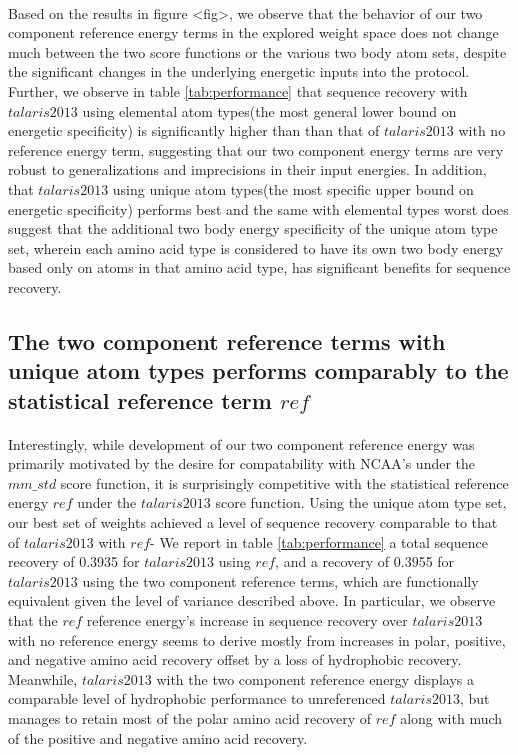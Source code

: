 \paragraph{}
Based on the results in figure <fig>, we observe that the behavior of our two component reference energy terms in the explored weight space does not change much between the two score functions or the various two body atom sets, despite the significant changes in the underlying energetic inputs into the protocol. 
Further, we observe in table \ref{tab:performance} that sequence recovery with $talaris2013$ using elemental atom types(the most general lower bound on energetic specificity) is significantly higher than than that of $talaris2013$ with no reference energy term, suggesting that our two component energy terms are very robust to generalizations and imprecisions in their input energies.
In addition, that $talaris2013$ using unique atom types(the most specific upper bound on energetic specificity) performs best and the same with elemental types worst does suggest that the additional two body energy specificity of the unique atom type set, wherein each amino acid type is considered to have its own two body energy based only on atoms in that amino acid type, has significant benefits for sequence recovery.

\subsection{The two component reference terms with unique atom types performs comparably to the statistical reference term $ref$}
\paragraph{}
Interestingly, while development of our two component reference energy was primarily motivated by the desire for compatability with NCAA's under the $mm\_std$ score function, it is surprisingly competitive with the statistical reference energy $ref$ under the $talaris2013$ score function.
Using the unique atom type set, our best set of weights achieved a level of sequence recovery comparable to that of $talaris2013$ with $ref$-
We report in table \ref{tab:performance} a total sequence recovery of 0.3935 for $talaris2013$ using $ref$, and a recovery of 0.3955 for $talaris2013$ using the two component reference terms, which are functionally equivalent given the level of variance described above.
In particular, we observe that the $ref$ reference energy's increase in sequence recovery over $talaris2013$ with no reference energy seems to derive mostly from increases in polar, positive, and negative amino acid recovery offset by a loss of hydrophobic recovery.
Meanwhile, $talaris2013$ with the two component reference energy displays a comparable level of hydrophobic performance to unreferenced $talaris2013$, but manages to retain most of the polar amino acid recovery of $ref$ along with much of the positive and negative amino acid recovery.

